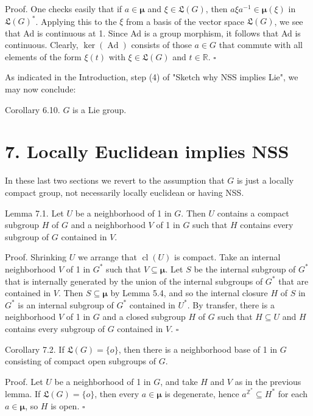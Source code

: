 \documentclass[10pt]{article}
\begin{document}
Proof. One checks easily that if $a \in \boldsymbol{\mu}$ and $\xi \in \mathfrak{L}(G)$, then $a \xi a^{-1} \in \boldsymbol{\mu}(\xi)$ in $\mathfrak{L}(G)^{*}$. Applying this to the $\xi$ from a basis of the vector space $\mathfrak{L}(G)$, we see that Ad is continuous at 1. Since Ad is a group morphism, it follows that Ad is continuous. Clearly, $\operatorname{ker}(\operatorname{Ad})$ consists of those $a \in G$ that commute with all elements of the form $\xi(t)$ with $\xi \in \mathfrak{L}(G)$ and $t \in \mathbb{R}$. \(\square\)

As indicated in the Introduction, step (4) of "Sketch why NSS implies Lie", we may now conclude:

Corollary 6.10. $G$ is a Lie group.

\section*{7. Locally Euclidean implies NSS}
In these last two sections we revert to the assumption that $G$ is just a locally compact group, not necessarily locally euclidean or having NSS.

Lemma 7.1. Let $U$ be a neighborhood of 1 in $G$. Then $U$ contains a compact subgroup $H$ of $G$ and a neighborhood $V$ of 1 in $G$ such that $H$ contains every subgroup of $G$ contained in $V$.

Proof. Shrinking $U$ we arrange that $\operatorname{cl}(U)$ is compact. Take an internal neighborhood $V$ of 1 in $G^{*}$ such that $V \subseteq \boldsymbol{\mu}$. Let $S$ be the internal subgroup of $G^{*}$ that is internally generated by the union of the internal subgroups of $G^{*}$ that are contained in $V$. Then $S \subseteq \boldsymbol{\mu}$ by Lemma 5.4, and so the internal closure $H$ of $S$ in $G^{*}$ is an internal subgroup of $G^{*}$ contained in $U^{*}$. By transfer, there is a neighborhood $V$ of 1 in $G$ and a closed subgroup $H$ of $G$ such that $H \subseteq U$ and $H$ contains every subgroup of $G$ contained in $V$. \(\square\)

Corollary 7.2. If $\mathfrak{L}(G)=\{o\}$, then there is a neighborhood base of 1 in $G$ consisting of compact open subgroups of $G$.

Proof. Let $U$ be a neighborhood of 1 in $G$, and take $H$ and $V$ as in the previous lemma. If $\mathfrak{L}(G)=\{o\}$, then every $a \in \boldsymbol{\mu}$ is degenerate, hence $a^{\mathbb{Z}^{*}} \subseteq H^{*}$ for each $a \in \boldsymbol{\mu}$, so $H$ is open. \(\square\)
\end{document}
